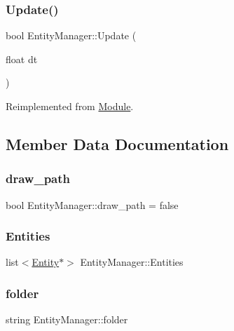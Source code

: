 \subsubsection{\texorpdfstring{Update()}{Update()}}
{\footnotesize\ttfamily bool Entity\+Manager\+::\+Update (\begin{DoxyParamCaption}\item[{float}]{dt }\end{DoxyParamCaption})\hspace{0.3cm}{\ttfamily [virtual]}}



Reimplemented from \mbox{\hyperlink{class_module_ac1a7b6dca73586b9cce2e67647af58d8}{Module}}.



\subsection{Member Data Documentation}
\mbox{\label{class_entity_manager_a388b254709bddf12a82709b671a43d28}} 
\subsubsection{\texorpdfstring{draw\_path}{draw\_path}}
{\footnotesize\ttfamily bool Entity\+Manager\+::draw\+\_\+path = false}

\mbox{\label{class_entity_manager_afddbd7d396bbcf51f63c05102da4dbf9}} 
\subsubsection{\texorpdfstring{Entities}{Entities}}
{\footnotesize\ttfamily list$<$\mbox{\hyperlink{class_entity}{Entity}}$\ast$$>$ Entity\+Manager\+::\+Entities}

\mbox{\label{class_entity_manager_aca6f046da49e1c17f9ba3061f6180752}} 
\subsubsection{\texorpdfstring{folder}{folder}}
{\footnotesize\ttfamily string Entity\+Manager\+::folder}

